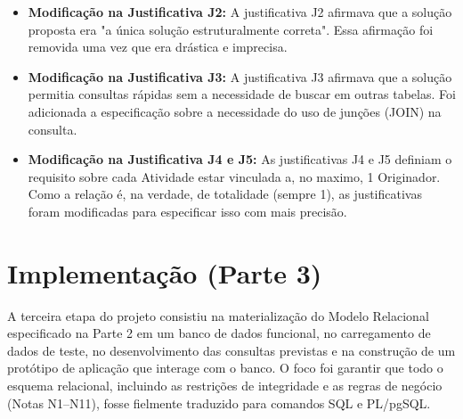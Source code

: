 \documentclass[12pt]{article}
\begin{document}
\begin{itemize}
\begin{itemize}
        \item Na tabela \texttt{Lote}, o atributo \texttt{Status\_Ciclo\_de\_Vida} foi alterado para \texttt{NOT NULL}. O ativo ambiental deve obrigatoriamente estar em um estado conhecido (Disponível, Aposentado ou Invalidado) para que a aplicação possa aplicar as restrições de mercado, como impedir a venda de créditos já aposentados.
        
        \item Na tabela \texttt{Laudo}, o atributo \texttt{Certificador} foi alterado para \texttt{NOT NULL}, garantindo que todo documento de auditoria submetido possua um órgão certificador legalmente responsável por sua futura avaliação.
    \end{itemize}
    
    \item \textbf{Modificação na Justificativa J2:} A justificativa J2 afirmava que a solução proposta era "a única solução estruturalmente correta". Essa afirmação foi removida uma vez que era drástica e imprecisa.
    
    \item \textbf{Modificação na Justificativa J3:} A justificativa J3 afirmava que a solução permitia consultas rápidas sem a necessidade de buscar em outras tabelas. Foi adicionada a especificação sobre a necessidade do uso de junções (JOIN) na consulta.
    
    \item \textbf{Modificação na Justificativa J4 e J5:} As justificativas J4 e J5 definiam o requisito sobre cada Atividade estar vinculada a, no maximo, 1 Originador. Como a relação é, na verdade, de totalidade (sempre 1), as justificativas foram modificadas para especificar isso com mais precisão.
\end{itemize}

\section{Implementação (Parte 3)}
A terceira etapa do projeto consistiu na materialização do Modelo Relacional especificado na Parte 2 em um banco de dados funcional, no carregamento de dados de teste, no desenvolvimento das consultas previstas e na construção de um protótipo de aplicação que interage com o banco. O foco foi garantir que todo o esquema relacional, incluindo as restrições de integridade e as regras de negócio (Notas N1--N11), fosse fielmente traduzido para comandos SQL e PL/pgSQL.
\end{document}
